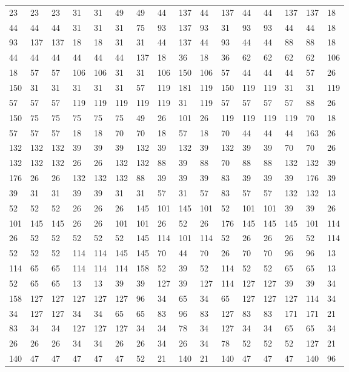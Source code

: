 \begin{longtable}{*{16}{l}}
23& 23& 23& 31& 31& 49& 49& 44& 137& 44& 137& 44& 44& 137& 137& 18\\
44& 44& 44& 31& 31& 31& 75& 93& 137& 93& 31& 93& 93& 44& 44& 18\\
93& 137& 137& 18& 18& 31& 31& 44& 137& 44& 93& 44& 44& 88& 88& 18\\
44& 44& 44& 44& 44& 44& 137& 18& 36& 18& 36& 62& 62& 62& 62& 106\\
18& 57& 57& 106& 106& 31& 31& 106& 150& 106& 57& 44& 44& 44& 57& 26\\
150& 31& 31& 31& 31& 31& 57& 119& 181& 119& 150& 119& 119& 31& 31& 119\\
57& 57& 57& 119& 119& 119& 119& 119& 31& 119& 57& 57& 57& 57& 88& 26\\
150& 75& 75& 75& 75& 75& 49& 26& 101& 26& 119& 119& 119& 119& 70& 18\\
57& 57& 57& 18& 18& 70& 70& 18& 57& 18& 70& 44& 44& 44& 163& 26\\
132& 132& 132& 39& 39& 39& 132& 39& 132& 39& 132& 39& 39& 70& 70& 26\\
132& 132& 132& 26& 26& 132& 132& 88& 39& 88& 70& 88& 88& 132& 132& 39\\
176& 26& 26& 132& 132& 132& 88& 39& 39& 39& 83& 39& 39& 39& 176& 39\\
39& 31& 31& 39& 39& 31& 31& 57& 31& 57& 83& 57& 57& 132& 132& 13\\
52& 52& 52& 26& 26& 26& 145& 101& 145& 101& 52& 101& 101& 39& 39& 26\\
101& 145& 145& 26& 26& 101& 101& 26& 52& 26& 176& 145& 145& 145& 101& 114\\
26& 52& 52& 52& 52& 52& 145& 114& 101& 114& 52& 26& 26& 26& 52& 114\\
52& 52& 52& 114& 114& 145& 145& 70& 44& 70& 26& 70& 70& 96& 96& 13\\
114& 65& 65& 114& 114& 114& 158& 52& 39& 52& 114& 52& 52& 65& 65& 13\\
52& 65& 65& 13& 13& 39& 39& 127& 39& 127& 114& 127& 127& 39& 39& 34\\
158& 127& 127& 127& 127& 127& 96& 34& 65& 34& 65& 127& 127& 127& 114& 34\\
34& 127& 127& 34& 34& 65& 65& 83& 96& 83& 127& 83& 83& 171& 171& 21\\
83& 34& 34& 127& 127& 127& 34& 34& 78& 34& 127& 34& 34& 65& 65& 34\\
26& 26& 26& 34& 34& 26& 26& 34& 26& 34& 78& 52& 52& 52& 127& 21\\
140& 47& 47& 47& 47& 47& 52& 21& 140& 21& 140& 47& 47& 47& 140& 96\\

\end{longtable}
